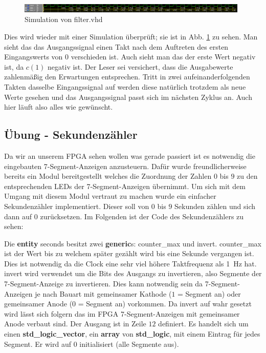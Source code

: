 \begin{figure}[ht]
	\centering
    \includegraphics[width=0.98\textwidth]{../Daten/filter.png}
	\caption{Simulation von filter.vhd}
	\label{img_filter}
\end{figure}

Dies wird wieder mit einer Simulation überprüft; sie ist in Abb. \ref{img_filter} zu sehen.
Man sieht das das Ausgangssignal einen Takt nach dem Auftreten des ersten Eingangswerts von $0$ verschieden ist.
Auch sieht man das der erste Wert negativ ist, da $c(1)$ negativ ist.
Der Leser sei versichert, dass die Ausgabewerte zahlenmäßig den Erwartungen entsprechen.
Tritt in zwei aufeinanderfolgenden Takten dasselbe Eingangssignal auf werden diese natürlich trotzdem als neue Werte gesehen und das Ausgangssignal passt sich im nächsten Zyklus an.
Auch hier läuft also alles wie gewünscht.

\subsection{Übung - Sekundenzähler}

Da wir an unserem FPGA sehen wollen was gerade passiert ist es notwendig die eingebauten 7-Segment-Anzeigen anzusteuern.
Dafür wurde freundlicherweise bereits ein Modul bereitgestellt welches die Zuordnung der Zahlen $0$ bis $9$ zu den entsprechenden LEDs der 7-Segment-Anzeigen übernimmt.
Um sich mit dem Umgang mit diesem Modul vertraut zu machen wurde ein einfacher Sekundenzähler implementiert.
Dieser soll von $0$ bis $9$ Sekunden zählen und sich dann auf $0$ zurücksetzen.
Im Folgenden ist der Code des Sekundenzählers zu sehen:



Die \textbf{entity} seconds besitzt zwei \textbf{generic}s: counter\_max und invert.
counter\_max ist der Wert bis zu welchem später gezählt wird bis eine Sekunde vergangen ist.
Dies ist notwendig da die Clock eine sehr viel höhere Taktfrequenz als \SI{1}{\hertz} hat.
invert wird verwendet um die Bits des Ausgangs zu invertieren, also Segmente der 7-Segment-Anzeige zu invertieren.
Dies kann notwendig sein da 7-Segment-Anzeigen je nach Bauart mit gemeinsamer Kathode ($1$ = Segment an) oder gemeinsamer Anode ($0$ = Segment an) vorkommen.
Da invert auf wahr gesetzt wird lässt sich folgern das im FPGA 7-Segment-Anzeigen mit gemeinsamer Anode verbaut sind.
Der Ausgang ist in Zeile $12$ definiert.
Es handelt sich um einen \textbf{std\_logic\_vector}, ein \textbf{array} von \textbf{std\_logic}, mit einem Eintrag für jedes Segment.
Er wird auf $0$ initialisiert (alle Segmente aus).

